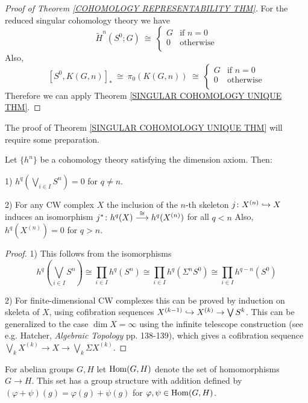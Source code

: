 \begin{proof}[Proof of Theorem \ref{COHOMOLOGY REPRESENTABILITY THM}]
For the reduced singular cohomology theory we have
\[
\widetilde{H}^{n}(S^{0}; G) \ \cong \ 
\begin{cases}
G & \text{if $n=0$} \\
0 & \text{otherwise} \\
\end{cases}
\]
Also, 
\[
[S^{0}, K(G, n)]_{\ast} \ \cong \ \pi_{0}(K(G, n)) \ \cong \ 
\begin{cases}
G & \text{if $n=0$} \\
0 & \text{otherwise} \\
\end{cases}
\]
Therefore we can apply Theorem \ref{SINGULAR COHOMOLOGY UNIQUE THM}.   
\end{proof}

The proof of Theorem \ref{SINGULAR COHOMOLOGY UNIQUE THM} will require some 
preparation. 

\begin{lemma} 
\label{COHOMOLOGY DIM AXIOM LEMMA}
Let $\{h^{n}\}$ be a cohomology theory satisfying the dimension 
axiom. Then: 
\benu
\item[1)] $h^{q}(\bigvee_{i\in I} S^{n}) = 0$ for $q \neq n$. 

\item[2)] For any CW complex $X$ the inclusion of the $n$-th skeleton
$j\colon X^{(n)} \hookrightarrow X$ induces an isomorphism 
$j^{\ast}\colon h^{q}(X) \overset{\cong}{\longrightarrow} h^{q}(X^{(n)})$ for all $q< n$
Also, $h^{q}(X^{(n)}) = 0$ for $q>n$. 
\eenu
\end{lemma}

\begin{proof}
1) This follows from the isomorphisms 
\[
h^{q}(\bigvee_{i\in I }S^{n}) \cong 
\prod_{i\in I} h^{q}(S^{n}) \cong 
\prod_{i\in I} h^{q}(\Sigma^{n} S^{0}) \cong 
\prod_{i\in I} h^{q - n}(S^{0})
\]

2) For finite-dimensional CW complexes this can be proved by induction on skeleta 
of $X$, using cofibration sequences 
$X^{(k-1)} \hookrightarrow X^{(k)} \to \bigvee S^{k}$. This can be generalized to 
the case $\dim X = \infty$ using the infinite telescope construction 
(see e.g. Hatcher, \emph{Algebraic Topology} pp. 138-139), which gives a 
cofibration sequence $\bigvee_{k} X^{(k)} \to X \to \bigvee_{k} \Sigma X^{(k)}$. 
\end{proof}


For abelian groups $G, H$ let $\mathrm{Hom}(G, H)$ denote the set of homomorphisms 
$G\to H$. This set has a group structure with addition defined by 
$(\varphi + \psi)(g) = \varphi(g) + \psi(g)$ for $\varphi, \psi\in \mathrm{Hom}(G, H)$.

